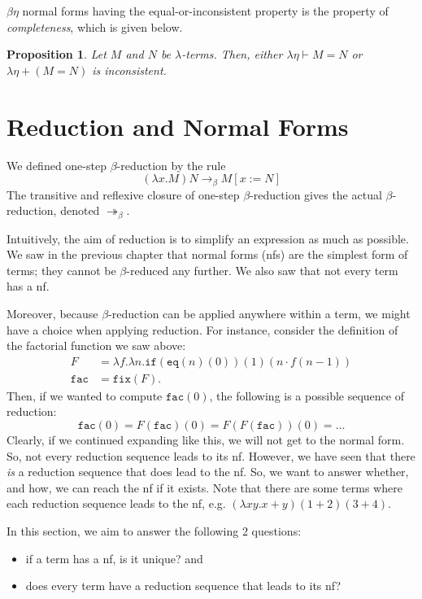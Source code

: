 \documentclass[a4paper, openany]{memoir}
\newtheorem{proposition}{Proposition}[section]
\theoremstyle{definition}
\begin{document}
    $\beta \eta$ normal forms having the equal-or-inconsistent property is the property of \emph{completeness}, which is given below.
    \begin{proposition}
        Let $M$ and $N$ be $\lambda$-terms. Then, either $\lambda \eta \vdash M = N$ or $\lambda \eta + (M = N)$ is inconsistent.
    \end{proposition}
    \newpage

    \section{Reduction and Normal Forms}
    We defined one-step $\beta$-reduction by the rule
    \[(\lambda x.M) N \to_\beta M[x := N]\]
    The transitive and reflexive closure of one-step $\beta$-reduction gives the actual $\beta$-reduction, denoted $\twoheadrightarrow_\beta$. 

    Intuitively, the aim of reduction is to simplify an expression as much as possible. We saw in the previous chapter that normal forms (nfs) are the simplest form of terms; they cannot be $\beta$-reduced any further. We also saw that not every term has a nf.

    Moreover, because $\beta$-reduction can be applied anywhere within a term, we might have a choice when applying reduction. For instance, consider the definition of the factorial function we saw above:
    \begin{align*}
        F &= \lambda f.\lambda n.\texttt{if}(\texttt{eq}(n)(0))(1)(n \cdot f(n-1)) \\
        \texttt{fac} &= \texttt{fix}(F).
    \end{align*}
    Then, if we wanted to compute $\texttt{fac}(0)$, the following is a possible sequence of reduction:
    \[\texttt{fac}(0) = F(\texttt{fac})(0) = F(F(\texttt{fac}))(0) = \dots \]
    Clearly, if we continued expanding like this, we will not get to the normal form. So, not every reduction sequence leads to its nf. However, we have seen that there \textit{is} a reduction sequence that does lead to the nf. So, we want to answer whether, and how, we can reach the nf if it exists. Note that there are some terms where each reduction sequence leads to the nf, e.g. $(\lambda xy. x + y)(1 + 2)(3 + 4)$.

    In this section, we aim to answer the following 2 questions:
    \begin{itemize}
        \item if a term has a nf, is it unique? and
        \item does every term have a reduction sequence that leads to its nf?
    \end{itemize}
    
\end{document}
